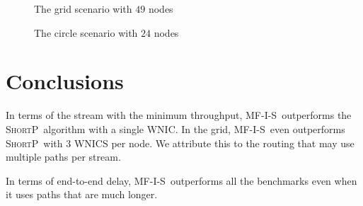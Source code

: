 \documentclass[12pt]{article}
\newenvironment{proof sketch}[1]{\noindent {\emph{Proof sketch of #1:}}}{\hfill \qed}
\newcommand{\algA}{\textsc{MF-I-S}}
\newcommand{\algB}{\textsc{ShortP}}
\newcommand{\algS}{\algB}
\begin{document}



\begin{figure}%
      \centering
       \caption{The grid scenario with $49$ nodes}
      \label{fig:big6}\label{fig:scenario grid}
     \end{figure}

\begin{figure}%
      \centering
        \caption{The circle scenario with $24$ nodes}
      \label{fig:big5}\label{fig:scenario circle}
     \end{figure}

\section{Conclusions}
In terms of the stream with the minimum throughput, \algA\ outperforms
the \algS\ algorithm with a single WNIC. In the grid, \algA\ even
outperforms \algS\ with $3$ WNICS per node.  We attribute this to the
routing that may use multiple paths per stream.

In terms of end-to-end delay, \algA\ outperforms all the benchmarks
even when it uses paths that are much longer.
\end{document}
